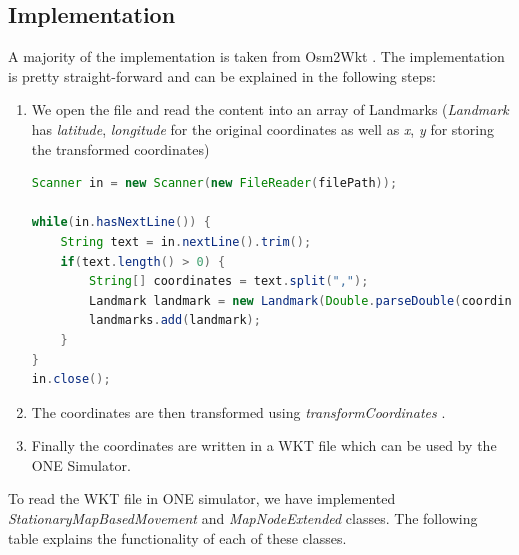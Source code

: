 \subsection{Implementation}
A majority of the implementation is taken from Osm2Wkt \cite{mayer2010osm}. The implementation is pretty straight-forward and can be explained in the following steps:
\begin{enumerate}
\item We open the file and read the content into an array of Landmarks (\textit{Landmark} has \textit{latitude}, \textit{longitude} for the original coordinates as well as \textit{x}, \textit{y} for storing the transformed coordinates)
\begin{lstlisting}[language=java]
Scanner in = new Scanner(new FileReader(filePath));

while(in.hasNextLine()) {
	String text = in.nextLine().trim();
	if(text.length() > 0) {
		String[] coordinates = text.split(",");
		Landmark landmark = new Landmark(Double.parseDouble(coordinates[0]), Double.parseDouble(coordinates[1]));
		landmarks.add(landmark);
	}
}
in.close();
\end{lstlisting}
\item The coordinates are then transformed using \textit{transformCoordinates} \cite{mayer2010osm}.
\item Finally the coordinates are written in a WKT file which can be used by the ONE Simulator.
\end{enumerate}

To read the WKT file in ONE simulator, we have implemented \textit{StationaryMapBasedMovement} and \textit{MapNodeExtended} classes. The following table explains the functionality of each of these classes.

